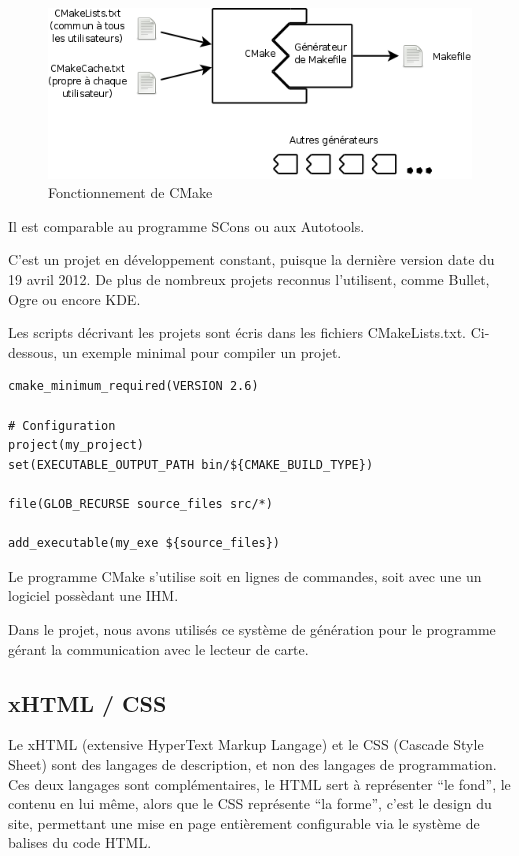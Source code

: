     \begin{figure}[h]
        \begin{center}
        \includegraphics[scale=0.4]{images/CMakeFonctionnement.png} 
        \end{center}
        \caption{Fonctionnement de CMake}
        \label{Fonctionnement de CMake}
     \end{figure} 

Il est comparable au programme SCons ou aux Autotools.

C'est un projet en développement constant, puisque la dernière version date du 19
avril 2012. De plus de nombreux projets reconnus l'utilisent, comme Bullet, Ogre
ou encore KDE.

Les scripts décrivant les projets sont écris dans les fichiers CMakeLists.txt.
Ci-dessous, un exemple minimal pour compiler un projet.

    \lstset{language=Bash}
    \begin{lstlisting} 
cmake_minimum_required(VERSION 2.6)
		
# Configuration
project(my_project)
set(EXECUTABLE_OUTPUT_PATH bin/${CMAKE_BUILD_TYPE})

file(GLOB_RECURSE source_files src/*)

add_executable(my_exe ${source_files})
    \end{lstlisting}

Le programme CMake s'utilise soit en lignes de commandes, soit avec une un logiciel
possèdant une IHM.

Dans le projet, nous avons utilisés ce système de génération pour le programme 
gérant la communication avec le lecteur de carte.


        \subsection{xHTML / CSS}
Le xHTML (extensive HyperText Markup Langage) et le CSS (Cascade Style Sheet) sont
des langages de description, et non des langages de programmation.
Ces deux langages sont complémentaires, le HTML sert à représenter ``le fond'', le contenu
en lui même, alors que le CSS représente ``la forme'', c'est le design du site, permettant
une mise en page entièrement configurable via le système de balises du code HTML.


